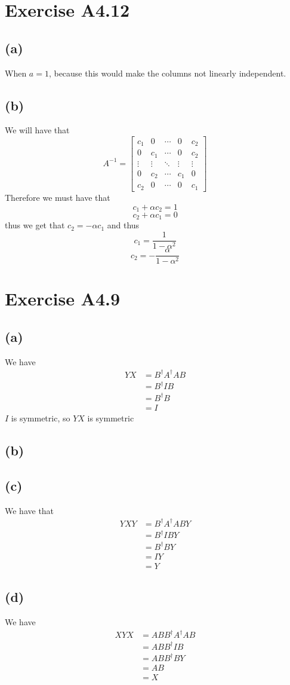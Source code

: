 \section*{Exercise A4.12}
\subsection*{(a)}
When $a=1$, because this would make the columns not linearly independent.
\subsection*{(b)}
We will have that 
$$A^{-1}=\begin{bmatrix}
    c_1 & 0 & \cdots & 0 & c_2\\
    0 & c_1 & \cdots & 0 & c_2\\
    \vdots & \vdots & \ddots & \vdots & \vdots\\
    0 & c_2 & \cdots & c_1 & 0\\
    c_2 & 0 & \cdots & 0 & c_1
\end{bmatrix}$$
Therefore we must have that 
$$c_1+\alpha c_2=1$$
$$c_2+\alpha c_1=0$$
thus we get that $c_2=-\alpha c_1$ and thus
$$c_1=\frac{1}{1-\alpha^2}$$
$$c_2=-\frac{\alpha}{1-\alpha^2}$$
\section*{Exercise A4.9}
\subsection*{(a)}
We have 
\begin{align*}
    YX&=B^{\dagger}A^{\dagger}AB\\
    &=B^{\dagger}IB\\
    &=B^{\dagger}B\\
    &=I
\end{align*}
$I$ is symmetric, so $YX$ is symmetric
\subsection*{(b)}
\subsection*{(c)}
We have that
\begin{align*}
    YXY&=B^{\dagger}A^{\dagger}ABY\\
    &=B^{\dagger}IBY\\
    &=B^{\dagger}BY\\
    &=IY\\
    &=Y
\end{align*}
\subsection*{(d)}
We have
\begin{align*}
    XYX&=ABB^{\dagger}A^{\dagger}AB\\
    &=ABB^{\dagger}IB\\
    &=ABB^{\dagger}BY\\
    &=AB\\
    &=X
\end{align*}

